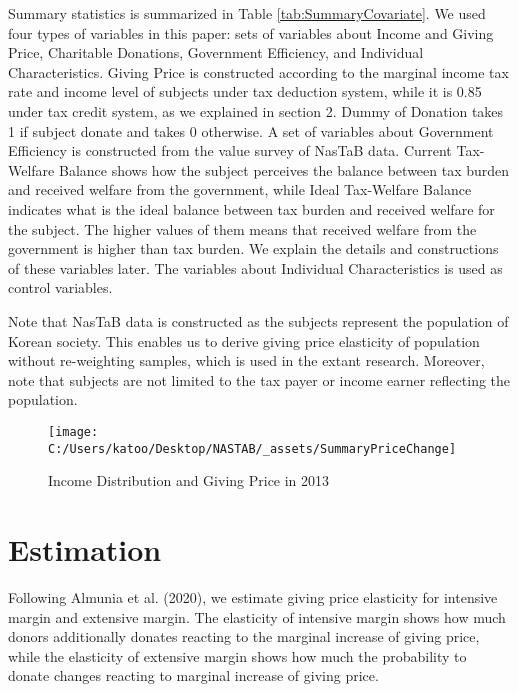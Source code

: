 \documentclass[ review  , 3p ]{elsarticle}
\begin{document}
  Summary statistics is summarized in Table \ref{tab:SummaryCovariate}. We used four types of variables in this paper: sets of variables about Income and Giving Price, Charitable Donations, Government Efficiency, and Individual Characteristics. Giving Price is constructed according to the marginal income tax rate and income level of subjects under tax deduction system, while it is 0.85 under tax credit system, as we explained in section 2. Dummy of Donation takes 1 if subject donate and takes 0 otherwise. A set of variables about Government Efficiency is constructed from the value survey of NasTaB data. Current Tax-Welfare Balance shows how the subject perceives the balance between tax burden and received welfare from the government, while Ideal Tax-Welfare Balance indicates what is the ideal balance between tax burden and received welfare for the subject. The higher values of them means that received welfare from the government is higher than tax burden. We explain the details and constructions of these variables later. The variables about Individual Characteristics is used as control variables.

  Note that NasTaB data is constructed as the subjects represent the population of Korean society. This enables us to derive giving price elasticity of population without re-weighting samples, which is used in the extant research. Moreover, note that subjects are not limited to the tax payer or income earner reflecting the population.

  \begin{figure}

  {\centering \texttt{[image: C:/Users/katoo/Desktop/NASTAB/\_assets/SummaryPriceChange]} 

  }

  \caption{Income Distribution and Giving Price in 2013}\label{fig:showSummaryPriceChange}
  \end{figure}

  \hypertarget{estimation}{%
  \section{Estimation}\label{estimation}}

  Following Almunia et al. (2020), we estimate giving price elasticity for intensive margin and extensive margin. The elasticity of intensive margin shows how much donors additionally donates reacting to the marginal increase of giving price, while the elasticity of extensive margin shows how much the probability to donate changes reacting to marginal increase of giving price.
\end{document}
